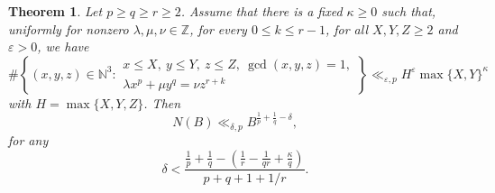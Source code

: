 \documentclass[10pt,a4paper]{amsart}
\newtheorem{theorem}{Theorem}
\renewcommand{\ge}{\geqslant}
\renewcommand{\geq}{\geqslant}
\renewcommand{\le}{\leqslant}
\newcommand\ve{\varepsilon}
\begin{document}
\begin{theorem}\label{prop:etagen}
Let $p\geq q\geq r\ge 2$. Assume that there is a fixed $\kappa\geq 0$ such that, uniformly for nonzero $\lambda,\mu,\nu\in\mathbb Z$, for every $0\le k\le r-1$, for all $X,Y,Z\geq 2$ and $\ve>0$, we have 
\[
\#\left\{(x,y,z)\in \mathbb N^3:
\begin{array}{l}
x\le X,\ y\le Y,\ z\le Z,\ \gcd(x,y,z)=1,\\
\lambda x^p+\mu y^q=\nu z^{r+k}
\end{array}
\right\}
\ll_{\varepsilon,p}
H^{\ve}\max\{X,Y\}^{\kappa}
\]
with $H=\max\{X,Y,Z\}$.
Then 
\[
N(B)\ll_{\delta, p}B^{\frac{1}{p}+\frac{1}{q}-\delta},
\]
for any 
\[
\delta<
 \frac{
 \displaystyle
 \frac1p+\frac1q-
 \left(
 \frac1r-\frac1{qr}+\frac{\kappa}q
 \right)}
 {p+q+1+1/r}.
\] 
\end{theorem}
\end{document}
